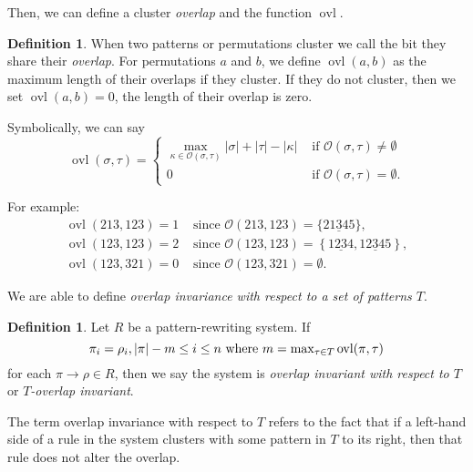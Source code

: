 \documentclass[a4paper, 11pt, english]{article}
\newcommand{\patternrule}{ \to \!}
\theoremstyle{definition}
\newtheorem{definition}[theorem]{Definition}
\newcommand{\Ocal}{\mathcal{O}}
\DeclareMathOperator{\ovl}{ovl}
\begin{document}
Then, we can define a cluster \emph{overlap} and the function $\ovl$.
\begin{definition}
  When two patterns or permutations cluster we call the bit they share their \emph{overlap}.
  For permutations $a$ and $b$, we define $\ovl(a,b)$ as the maximum length of their overlaps if they 
  cluster. If they do not cluster, then we set $\ovl(a,b)=0$, the length of their overlap is zero.

  Symbolically, we can say
  \[
    \ovl(\sigma, \tau) = 
      \begin{cases}
        \max\limits_{\kappa \in \Ocal(\sigma, \tau)} |\sigma| + |\tau| - |\kappa| & \mbox{ if } \Ocal(\sigma, \tau) \neq \emptyset \\
        0 & \text{ if $\Ocal(\sigma, \tau) = \emptyset$}.
      \end{cases}
  \]

  For example:
  \begin{align*}
    \ovl(213, 123) = 1 & \text{ since } \Ocal(213, 123) = \{ 21\underline{3}45 \}, \\
    \ovl(123, 123) = 2 & \text{ since } \Ocal(123, 123) = \left\{ 1\underline{23}4, 12\underline{3}45
  \right\}, \\
  \ovl(123, 321) = 0 & \text{ since } \Ocal(123, 321) = \emptyset.
  \end{align*}
\end{definition}

We are able to define \emph{overlap invariance with respect to a set of patterns $T$}.
\begin{definition}
    Let $R$ be a pattern-rewriting system. If
    \[
        \pi_i = \rho_i, |\pi|-m \leq i \leq n \  \textnormal{where}
        \ m = \max\nolimits_{\tau \in T} \ovl(\pi, \tau)
    \]
    for each $\pi \patternrule \rho \in R$,
    then we say the system is \emph{overlap invariant with respect to $T$} or \emph{$T$-overlap
    invariant}.
\end{definition}

The term overlap invariance with respect to $T$ refers to the fact that if a left-hand side of a rule in the system clusters
with some pattern in $T$ to its right, then that rule does not alter the overlap.
\end{document}
